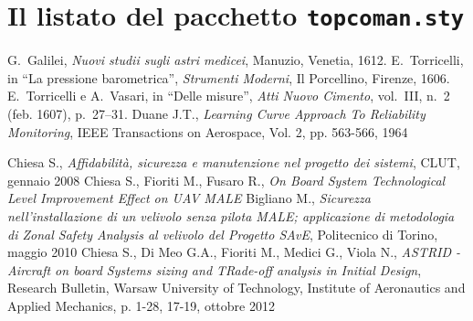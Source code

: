 \chapter{Il listato del pacchetto \texttt{topcoman.sty}}


\begin{thebibliography}{9}
	 G.~Galilei, {\em Nuovi studii sugli astri medicei}, Manuzio,
	Venetia, 1612.
	 E.~Torricelli, in ``La pressione barometrica'', {\em Strumenti
		Moderni}, Il Porcellino, Firenze, 1606.
	 E.~Torricelli e A.~Vasari, in ``Delle misure'', {\em Atti Nuovo
		Cimento}, vol.~III, n.~2 (feb. 1607), p.~27--31.
	 Duane J.T., \emph{Learning Curve Approach To Reliability 
		Monitoring}, IEEE Transactions on Aerospace, Vol. 2, pp. 563-566, 1964
\end{thebibliography}







 Chiesa S., \emph{Affidabilità, sicurezza e manutenzione 
	nel progetto dei sistemi}, CLUT, gennaio 2008
Chiesa S., Fioriti M., Fusaro R., \emph{On Board System 
	Technological  Level Improvement Effect on UAV MALE}
 Bigliano M., \emph{Sicurezza nell'installazione di un velivolo 
	senza pilota MALE; applicazione di metodologia di Zonal Safety 
	Analysis al velivolo del Progetto SAvE}, Politecnico di Torino, 
maggio 2010
 Chiesa S., Di Meo G.A., Fioriti M., Medici G., Viola N.,
\emph{ASTRID - Aircraft on board Systems sizing and TRade-off 
	analysis in Initial Design}, Research Bulletin, Warsaw University 
of Technology, Institute of Aeronautics and Applied Mechanics, 
p. 1-28, 17-19, ottobre 2012
